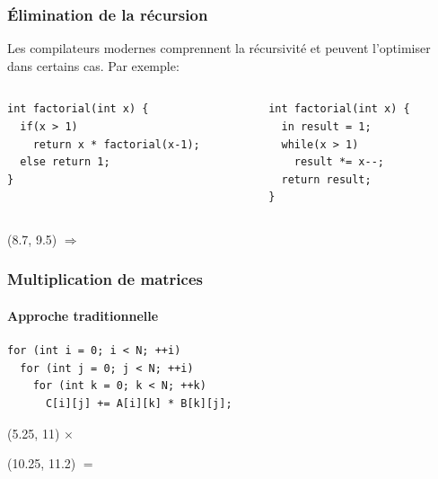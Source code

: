 \documentclass{beamer}
\begin{document}
\begin{frame}[fragile]
\frametitle{Élimination de la récursion}
Les compilateurs modernes comprennent la récursivité et peuvent l'optimiser dans certains cas. Par exemple:
\\
\begin{columns}
    \begin{column}{0.6\textwidth}
    \footnotesize{
    \begin{lstlisting}
int factorial(int x) {
  if(x > 1)
    return x * factorial(x-1);
  else return 1;
}
\end{lstlisting}}
    \end{column}
    \begin{column}{0.4\textwidth}
    \footnotesize{
    \begin{lstlisting}
int factorial(int x) {
  in result = 1;
  while(x > 1)
    result *= x--;
  return result;
}
\end{lstlisting}}
    \end{column}
\end{columns}
\begin{textblock}{5}(8.7, 9.5)
	 \Huge{$\Rightarrow$}
\end{textblock}
\end{frame}

\begin{frame}[fragile]
\frametitle{Multiplication de matrices}
\framesubtitle{Approche traditionnelle}
\begin{lstlisting}
for (int i = 0; i < N; ++i)
  for (int j = 0; j < N; ++i)
    for (int k = 0; k < N; ++k)
      C[i][j] += A[i][k] * B[k][j];
\end{lstlisting}


\begin{textblock}{5}(5.25, 11)
	 \Huge{$\times$}
\end{textblock}

\begin{textblock}{5}(10.25, 11.2)
	 \Huge{$=$}
\end{textblock}
\end{frame}
\end{document}
